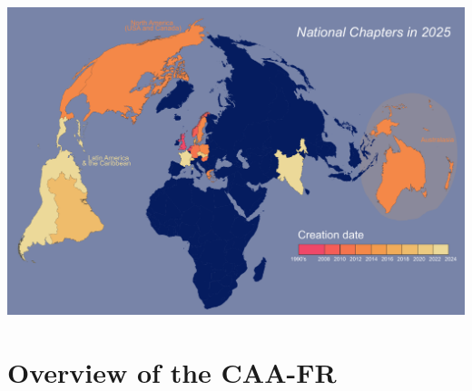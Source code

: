 \documentclass[xcolor=dvipsnames, 10pt, french, american]{beamer}
\begin{document}
 

\begin{frame}
    \centering
        \includegraphics[height=0.8\textheight]{figures/national-chapters2025}
\end{frame}



\section{Overview of the CAA-FR} 
\frame{\tableofcontents[sectionstyle=show/shaded, subsectionstyle=show/hide/hide]}
 
\end{document}
